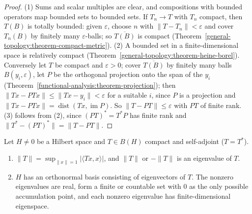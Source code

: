 \begin{proof}
(1) Sums and scalar multiples are clear, and compositions with bounded operators map bounded sets to bounded sets. If $T_n \to T$ with $T_n$ compact, then $T(B)$ is totally bounded: given $\varepsilon$, choose
$n$ with $\|T - T_n\| < \varepsilon$ and cover $T_n(B)$ by finitely many $\varepsilon$-balls; so $\overline{T(B)}$ is compact (Theorem~\ref{general-topology:theorem-compact-metric}). (2) A bounded set in a
finite-dimensional space is relatively compact (Theorem~\ref{general-topology:theorem-heine-borel}). Conversely let $T$ be compact and $\varepsilon > 0$; cover $\overline{T(B)}$ by finitely many balls
$B(y_i, \varepsilon)$, let $P$ be the orthogonal projection onto the span of the $y_i$ (Theorem~\ref{functional-analysis:theorem-projection}); then $\|Tx - PTx\| \leq \|Tx - y_i\| < \varepsilon$ for a suitable
$i$, since $P$ is a projection and $\|Tx - PTx\| = \operatorname{dist}(Tx, \operatorname{im}P)$. So $\|T - PT\| \leq \varepsilon$ with $PT$ of finite rank. (3) follows from (2), since $(PT)^* = T^*P$ has finite
rank and $\|T^* - (PT)^*\| = \|T - PT\|$.
\end{proof}

\begin{theorem}\label{functional-analysis:theorem-spectral-compact}
Let $H \neq 0$ be a Hilbert space and $T \in B(H)$ compact and self-adjoint ($T = T^*$).
\begin{enumerate}
\item $\|T\| = \sup_{\|x\| = 1}|\langle Tx, x \rangle|$, and $\|T\|$ or $-\|T\|$ is an eigenvalue of $T$.
\item $H$ has an orthonormal basis consisting of eigenvectors of $T$. The nonzero eigenvalues are real, form a finite or countable set with $0$ as the only possible accumulation point, and each nonzero
eigenvalue has finite-dimensional eigenspace.
\end{enumerate}
\end{theorem}


